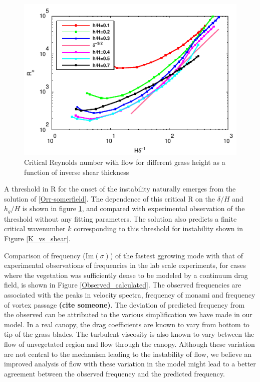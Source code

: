 \documentclass[aps,prl,twocolumn,showpacs,superscriptaddress,groupedaddress,10pt]{revtex4-1}  %
\newcommand{\hg}{h_g}
\newcommand{\Rey}{\text{R}}
\newcommand{\shreyas}[1]{{\bf (#1)}}
\begin{document}
\begin{figure}[htb]
\includegraphics[]{Critical_Re_vs_delta}
\caption{Critical Reynolds number with flow for different grass height as a function of inverse shear thickness}
\label{Re_vs_delta}
\end{figure}
A threshold in $\Rey$ for the onset of the instability naturally emerges from the solution of \eqref{Orr-somerfield}. The dependence of this critical $\Rey$ on the $\delta/H$ and $\hg/H$ is shown in figure \ref{Re_vs_delta}, and compared with experimental observation of the threshold\cite{Ghisal02} without any fitting parameters. The solution also predicts a finite critical wavenumber $k$ corresponding to this threshold for instability shown in Figure \ref{K_vs_shear}. 

Comparison of frequency (Im$(\sigma)$) of the fastest ggrowing mode with that of experimental observations of frequencies in the lab scale experiments, for cases where the vegetation was sufficiently dense to be modeled by a continuum drag field, is shown in Figure \ref{Observed_calculated}. The observed frequencies are associated with the peaks in velocity spectra, frequency of monami and frequency of vortex passage \shreyas{cite someone}. The deviation of predicted frequency from the observed can be attributed to the various simplification we have made in our model. In a real canopy, the drag coefficients are known to
vary from bottom to tip of the grass blades\cite{Vivoni98,Nepf00}. The turbulent viscosity is also known to vary between the flow of unvegetated region and flow through the canopy. Although these variation
are not central to the mechanism leading to the instability of flow, we believe an improved analysis of flow with these variation in the model might lead to a better agreement between the
observed frequency and the predicted frequency.
\end{document}
